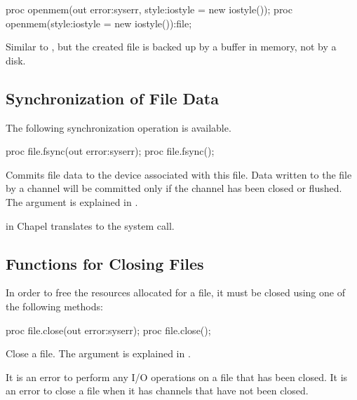 \begin{protohead}
proc openmem(out error:syserr, style:iostyle = new iostyle());
proc openmem(style:iostyle = new iostyle()):file;
\end{protohead}
\begin{protobody}
Similar to , but
the created file is backed up by a buffer in memory, not by a disk.
\end{protobody}


\subsection{Synchronization of File Data}
\label{IO_file_synchronization}

The following synchronization operation is available.

\begin{protohead}
proc file.fsync(out error:syserr);
proc file.fsync();
\end{protohead}
\begin{protobody}
Commits file data to the device associated with this file.
Data written to the file by a channel will be committed
only if the channel has been closed or flushed.
The  argument is explained in .
\end{protobody}
\begin{craychapel}
 in Chapel translates to the  system call.
\end{craychapel}


\subsection{Functions for Closing Files}
\label{IO_closing_files}

In order to free the resources allocated for a file, it
must be closed using one of the following methods:

\begin{protohead}
proc file.close(out error:syserr);
proc file.close();
\end{protohead}
\begin{protobody}
Close a file.
The  argument is explained in .
\end{protobody}

It is an error to perform any I/O operations on a file
that has been closed.
It is an error to close a file when it has channels that
have not been closed.

